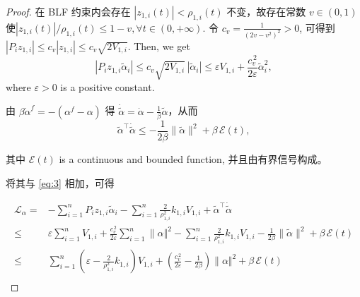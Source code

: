 \documentclass[pdflatex,sn-mathphys-num]{sn-jnl}%
\theoremstyle{thmstyleone}%
\theoremstyle{thmstyletwo}%
\theoremstyle{thmstylethree}%
\begin{document}
\begin{proof}
 
在 BLF 约束内会存在 $|z_{1,i}(t)|<\rho_{1,i}(t)$ 不变，故存在常数 $v\in(0,1)$ 使${|z_{1,i}(t)|}/{\rho_{1,i}(t)}\le 1-v, \forall t \in (0,+\infty)$. 令 $c_v=\frac{1}{(2v-v^2)^2}>0$, 可得到
$
|P_{i}z_{1,i}| \le c_v |z_{1,i}|\le c_v \sqrt{2V_{1,i}}
$. Then, we get
$$
|P_{i}z_{1,i}\tilde\alpha_i|
\le c_v\sqrt{2V_{1,i}}\,|\tilde\alpha_i|
\le \varepsilon V_{1,i}+\frac{c_v^{\,2}}{2\varepsilon}\tilde\alpha_i^2,
$$
where $\varepsilon>0$ is a positive constant.

由 $\beta\dot\alpha^f=-(\alpha^f-\alpha)$ 得 $\dot{\tilde\alpha}=\dot\alpha-\tfrac{1}{\beta}\tilde\alpha$，从而
$$
\tilde\alpha^\top\dot{\tilde\alpha}
\le -\frac{1}{2\beta}\|\tilde\alpha\|^2+\beta\,\mathcal{E}(t),
$$
 

其中 $\mathcal{E}(t)$ is a continuous and bounded function, 并且由有界信号构成。

将其与 \eqref{eq:3} 相加，可得

\begin{equation}\label{eq:50}
\begin{aligned}
	\mathcal{L}_{\alpha}=&-\sum_{i=1}^n P_{i}z_{1,i}\tilde\alpha_i
- \sum_{i=1}^n \frac{2}{\rho_{1,i}^2}k_{1,i}V_{1,i}
+\tilde\alpha^\top\dot{\tilde\alpha}\\
\le & \varepsilon \sum_{i=1}^n V_{1,i}+\frac{c_v^{\,2}}{2\varepsilon}\sum_{i=1}^n \|\alpha\Vert^2- \sum_{i=1}^n \frac{2}{\rho_{1,i}^2}k_{1,i}V_{1,i}-\frac{1}{2\beta}\|\tilde\alpha\|^2+\beta\,\mathcal{E}(t)\\
\le &
\sum_{i=1}^n \left(\varepsilon-\frac{2}{\rho_{1,i}^2}k_{1,i}\right) V_{1,i}
+\left(\frac{c_v^{\,2}}{2\varepsilon}-\frac{1}{2\beta}\right)\|\alpha\Vert^2
+\beta\,\mathcal{E}(t)\\
\end{aligned}
\end{equation}



\end{proof}
\end{document}
